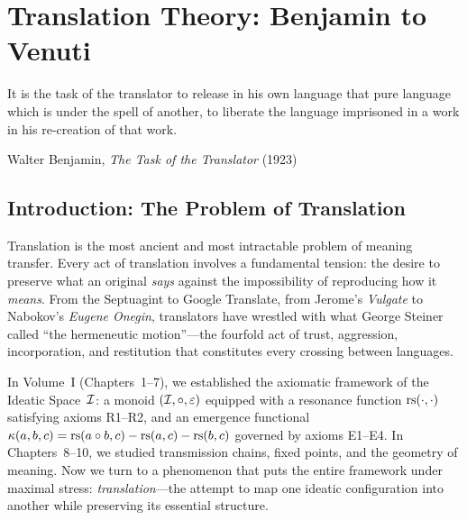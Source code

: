 %
%

\chapter{Translation Theory: Benjamin to Venuti}
\label{ch:translation}

\epigraph{It is the task of the translator to release in his own language
that pure language which is under the spell of another, to liberate the
language imprisoned in a work in his re-creation of that work.}%
{Walter Benjamin, \emph{The Task of the Translator} (1923)}

\section{Introduction: The Problem of Translation}

Translation is the most ancient and most intractable problem of meaning
transfer.  Every act of translation involves a fundamental tension: the
desire to preserve what an original \emph{says} against the impossibility of
reproducing how it \emph{means}.  From the Septuagint to Google Translate,
from Jerome's \emph{Vulgate} to Nabokov's \emph{Eugene Onegin}, translators
have wrestled with what George Steiner called ``the hermeneutic motion''---the
fourfold act of trust, aggression, incorporation, and restitution that
constitutes every crossing between languages.

In Volume~I (Chapters~1--7), we established the axiomatic framework of the
Ideatic Space~$\mathcal{I}$: a monoid $(\mathcal{I}, \circ, \varepsilon)$ equipped with a
resonance function $\mathrm{rs}(\cdot, \cdot)$ satisfying axioms R1--R2, and an
emergence functional $\kappa(a,b,c) = \mathrm{rs}(a \circ b, c) - \mathrm{rs}(a, c) -
\mathrm{rs}(b, c)$ governed by axioms E1--E4.  In Chapters~8--10, we studied
transmission chains, fixed points, and the geometry of meaning.  Now we turn
to a phenomenon that puts the entire framework under maximal stress:
\emph{translation}---the attempt to map one ideatic configuration into
another while preserving its essential structure.

